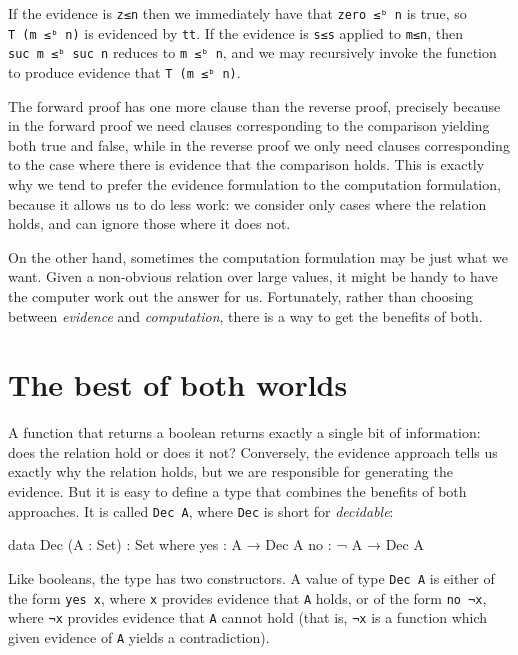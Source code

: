 If the evidence is \texttt{z≤n} then we immediately have that
\texttt{zero\ ≤ᵇ\ n} is true, so \texttt{T\ (m\ ≤ᵇ\ n)} is evidenced by
\texttt{tt}. If the evidence is \texttt{s≤s} applied to \texttt{m≤n},
then \texttt{suc\ m\ ≤ᵇ\ suc\ n} reduces to \texttt{m\ ≤ᵇ\ n}, and we
may recursively invoke the function to produce evidence that
\texttt{T\ (m\ ≤ᵇ\ n)}.

The forward proof has one more clause than the reverse proof, precisely
because in the forward proof we need clauses corresponding to the
comparison yielding both true and false, while in the reverse proof we
only need clauses corresponding to the case where there is evidence that
the comparison holds. This is exactly why we tend to prefer the evidence
formulation to the computation formulation, because it allows us to do
less work: we consider only cases where the relation holds, and can
ignore those where it does not.

On the other hand, sometimes the computation formulation may be just
what we want. Given a non-obvious relation over large values, it might
be handy to have the computer work out the answer for us. Fortunately,
rather than choosing between \emph{evidence} and \emph{computation},
there is a way to get the benefits of both.

\hypertarget{the-best-of-both-worlds}{%
\section{The best of both worlds}\label{the-best-of-both-worlds}}

A function that returns a boolean returns exactly a single bit of
information: does the relation hold or does it not? Conversely, the
evidence approach tells us exactly why the relation holds, but we are
responsible for generating the evidence. But it is easy to define a type
that combines the benefits of both approaches. It is called
\texttt{Dec\ A}, where \texttt{Dec} is short for \emph{decidable}:

\begin{fence}
\begin{code}
data Dec (A : Set) : Set where
  yes :   A → Dec A
  no  : ¬ A → Dec A
\end{code}
\end{fence}

Like booleans, the type has two constructors. A value of type
\texttt{Dec\ A} is either of the form \texttt{yes\ x}, where \texttt{x}
provides evidence that \texttt{A} holds, or of the form \texttt{no\ ¬x},
where \texttt{¬x} provides evidence that \texttt{A} cannot hold (that
is, \texttt{¬x} is a function which given evidence of \texttt{A} yields
a contradiction).

